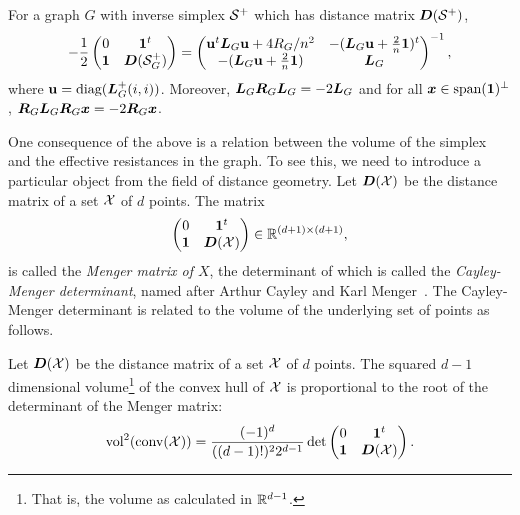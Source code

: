 \begin{corollary}
	For a  graph $G$ with inverse simplex $\mathcal{S}^+$ which has distance matrix  $\vb*{D}(\mathcal{S}^+)$, 
	\begin{equation}
	\label{eq:block_inverse_graph_simplex}
	-\frac{1}{2}\begin{pmatrix}
	0 & \vb{1}^t \\
	\vb{1} & \vb*{D}(\mathcal{S}_G^+)
	\end{pmatrix} = 
	\begin{pmatrix}
	\vb{u}^t  \vb*{L}_G \vb{u}  + 4R_G/n^2
	&  -(\vb*{L}_G\vb{u} + \frac{2}{n}\vb{1} )^t \\
	-(\vb*{L}_G\vb{u} + \frac{2}{n}\vb{1} ) 
	& \vb*{L}_G
	\end{pmatrix}^{-1},
	\end{equation}
	where $\vb{u}=\text{diag}(\vb*{L}_G^+(i,i))$. Moreover,  $\vb*{L}_G\vb*{R}_G\vb*{L}_G=-2\vb*{L}_G$ and for all $\vb*{x}\in\textnormal{span}(\vb{1})^\perp$, $\vb*{R}_G\vb*{L}_G\vb*{R}_G\vb*{x}=-2\vb*{R}_G\vb*{x}$. 
\end{corollary}

One consequence of the above is a relation between the volume of the simplex and the effective resistances in the graph. To see this, we need to introduce a particular object from the field of distance geometry. Let $\vb*{D}(\mathcal{X})$ be the distance matrix of a set $\mathcal{X}$ of $d$ points. The matrix 
\begin{equation}
\label{eq:menger_matrix}
\begin{pmatrix}
0 & \vb{1}^t \\
\vb{1} & \vb*{D}(\mathcal{X})
\end{pmatrix}\in\mathbb{R}^{(d+1)\times (d+1)},
\end{equation}
is called the \emph{Menger matrix of $X$}, the determinant of which is called the \emph{Cayley-Menger determinant}, named after Arthur Cayley and Karl Menger~\cite{cayley1841theorem, Menger1928}. The Cayley-Menger determinant is related to the volume of the underlying set of points as follows. 


\begin{lemma}
	\label{lem:menger_volume}
	Let $\vb*{D}(\mathcal{X})$ be the distance matrix of a set $\mathcal{X}$ of $d$ points. The squared $d-1$ dimensional volume\footnote{That is, the volume as calculated in $\mathbb{R}^{d-1}$.} of the convex hull of $\mathcal{X}$ is proportional to the root of the determinant of the Menger matrix: 
	\begin{equation}
	\label{eq:vol(convX)}
	\textnormal{vol}^2(\textnormal{conv}(\mathcal{X})) = \frac{(-1)^d}{((d-1)!)^2 2^{d-1}} \det\begin{pmatrix}
	0 & \vb{1}^t \\
	\vb{1} & \vb*{D}(\mathcal{X})
	\end{pmatrix}.
	\end{equation} 
\end{lemma}

